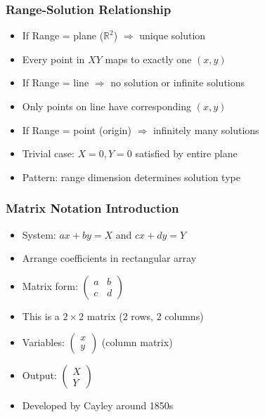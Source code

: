 \begin{frame}[fragile]\frametitle{Range-Solution Relationship}
  \begin{itemize}
    \item If Range = plane ($\mathbb{R}^2$) $\Rightarrow$ unique solution
    \item Every point in $XY$ maps to exactly one $(x,y)$
    \item If Range = line $\Rightarrow$ no solution or infinite solutions
    \item Only points on line have corresponding $(x,y)$
    \item If Range = point (origin) $\Rightarrow$ infinitely many solutions
    \item Trivial case: $X = 0, Y = 0$ satisfied by entire plane
    \item Pattern: range dimension determines solution type
  \end{itemize}
\end{frame}

\begin{frame}[fragile]\frametitle{Matrix Notation Introduction}
  \begin{itemize}
    \item System: $ax + by = X$ and $cx + dy = Y$
    \item Arrange coefficients in rectangular array
    \item Matrix form: $\begin{pmatrix} a & b \\ c & d \end{pmatrix}$
    \item This is a $2 \times 2$ matrix (2 rows, 2 columns)
    \item Variables: $\begin{pmatrix} x \\ y \end{pmatrix}$ (column matrix)
    \item Output: $\begin{pmatrix} X \\ Y \end{pmatrix}$
    \item Developed by Cayley around 1850s
  \end{itemize}
\end{frame}

